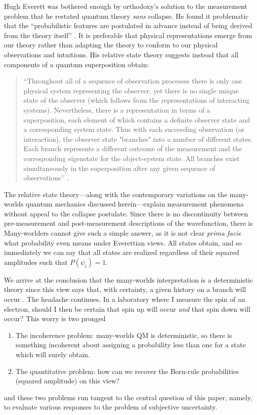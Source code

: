 \documentclass{article}
\begin{document}
Hugh Everett was bothered enough by orthodoxy's solution to the measurement problem that he restated quantum theory \emph{sans} collapse. He found it problematic that the “probabilistic features are postulated in advance instead of being derived from the theory itself” \parencite[462]{everettRelativeStateFormulation1957}. It is preferable that physical representations emerge from our theory rather than adapting the theory to conform to our physical observations and intuitions. His relative state theory suggests instead that all components of a quantum superposition obtain:
\begin{quote}
  ``Throughout all of a sequence of observation processes there is only one physical system representing the observer, yet there is no single unique state of the observer (which follows from the representations of interacting systems). Nevertheless, there is a representation in terms of a superposition, each element of which contains a definite observer state and a corresponding system state. Thus with each succeeding observation (or interaction), the observer state "branches" into a number of different states. Each branch represents a different outcome of the measurement and the corresponding eigenstate for the object-system state. All branches exist simultaneously in the superposition after any given sequence of observations’’ \parencite[459]{everettRelativeStateFormulation1957}.
\end{quote}
The relative state theory—along with the contemporary variations on the many-worlds quantum mechanics discussed herein—explain measurement phenomena without appeal to the collapse postulate. 
Since there is no discontinuity between pre-measurement and post-measurement descriptions of the wavefunction, there is 
Many-worlders cannot give such a simple answer, as it is not clear \emph{prima facie} what probability even means under Everettian views. All states obtain, and so immediately we can say that all states are realized regardless of their squared amplitudes such that $P(\psi_i)=1$.

We arrive at the conclusion that the many-worlds interpretation is a deterministic theory since this view says that, with certainty, a given history on a branch will occur \parencite{albertProbabilityEverettPicture2010}. The headache continues. In a laboratory where I measure the spin of an electron, should I then be certain that spin up will occur \emph{and} that spin down will occur? This worry is two pronged \parencite[1]{wallaceEpistemologyQuantizedCircumstances2006}
\begin{enumerate}
\item The incoherence problem: many-worlds QM is deterministic, so there is something incoherent about assigning a probability less than one for a state which will surely obtain.
\item The quantitative problem: how can we recover the Born-rule probabilities (squared amplitude) on this view?
\end{enumerate}
and these two problems run tangent to the central question of this paper, namely, to evaluate various responses to the problem of subjective uncertainty.
\end{document}
